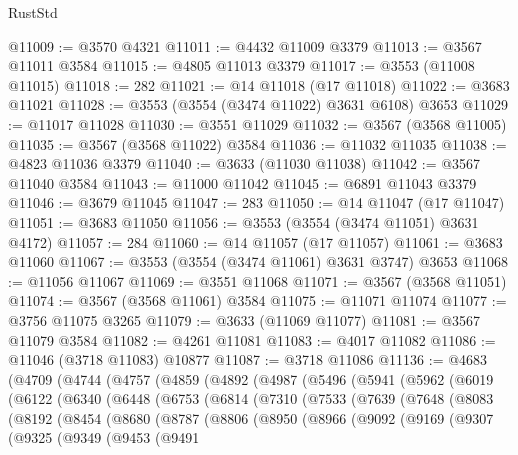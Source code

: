 \begin{lexlean}{RustStd}
\begin{coremodule}
@11009 := @3570 @4321
@11011 := @4432 @11009 @3379
@11013 := @3567 @11011 @3584
@11015 := @4805 @11013 @3379
@11017 := @3553 (@11008 @11015)
@11018 := 282
@11021 := @14 @11018 (@17 @11018)
@11022 := @3683 @11021
@11028 := @3553 (@3554 (@3474 @11022) @3631 @6108) @3653
@11029 := @11017 @11028
@11030 := @3551 @11029
@11032 := @3567 (@3568 @11005)
@11035 := @3567 (@3568 @11022) @3584
@11036 := @11032 @11035
@11038 := @4823 @11036 @3379
@11040 := @3633 (@11030 @11038)
@11042 := @3567 @11040 @3584
@11043 := @11000 @11042
@11045 := @6891 @11043 @3379
@11046 := @3679 @11045
@11047 := 283
@11050 := @14 @11047 (@17 @11047)
@11051 := @3683 @11050
@11056 := @3553 (@3554 (@3474 @11051) @3631 @4172)
@11057 := 284
@11060 := @14 @11057 (@17 @11057)
@11061 := @3683 @11060
@11067 := @3553 (@3554 (@3474 @11061) @3631 @3747) @3653
@11068 := @11056 @11067
@11069 := @3551 @11068
@11071 := @3567 (@3568 @11051)
@11074 := @3567 (@3568 @11061) @3584
@11075 := @11071 @11074
@11077 := @3756 @11075 @3265
@11079 := @3633 (@11069 @11077)
@11081 := @3567 @11079 @3584
@11082 := @4261 @11081
@11083 := @4017 @11082
@11086 := @11046 (@3718 @11083) @10877
@11087 := @3718 @11086
@11136 := @4683
    (@4709
      (@4744
        (@4757
          (@4859
            (@4892
              (@4987
                (@5496
                  (@5941
                    (@5962
                      (@6019
                        (@6122
                          (@6340
                            (@6448
                              (@6753
                                (@6814
                                  (@7310
                                    (@7533
                                      (@7639
                                        (@7648
                                          (@8083
                                            (@8192
                                              (@8454
                                                (@8680
                                                  (@8787
                                                    (@8806
                                                      (@8950
                                                        (@8966
                                                          (@9092
                                                            (@9169
                                                              (@9307
                                                                (@9325
                                                                  (@9349
                                                                    (@9453
                                                                      (@9491

\end{coremodule}
\end{lexlean}
